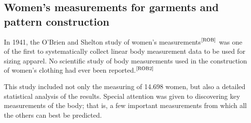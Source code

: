 \documentclass[12pt,a4paper,openany,UKenglish]{scrreprt}
\newcommand{\bib}[1]{$^\text{\cite{#1}}$}
\begin{document}
\subsection{Women's measurements for garments and pattern construction}
In 1941, the O’Brien and Shelton study of women’s measurements\bib{ROB} was one of the first to systematically collect linear body measurement data to be used for sizing apparel.
No scientific study of body measurements used in the construction of women's clothing had ever been reported.\bib{ROB2}

This study included not only the measuring of 14.698 women, but also a detailed statistical analysis of the results.
Special attention was given to discovering key measurements of the body; that is, a few important measurements from which all the others can best be predicted.
\end{document}
